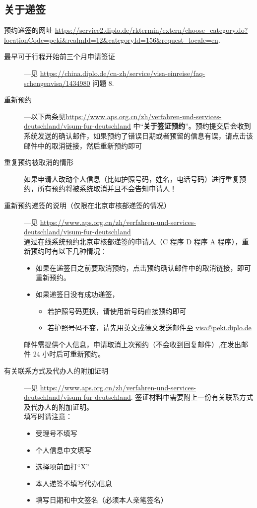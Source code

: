 \documentclass{article}
\begin{document}
\subsection{关于递签}\label{sec:visa}
预约递签的网址 \url{https://service2.diplo.de/rktermin/extern/choose_category.do?locationCode=peki&realmId=12&categoryId=156&request_locale=en}.
\begin{description}
\item[最早可于行程开始前三个月申请签证] ---见 \url{https://china.diplo.de/cn-zh/service/visa-einreise/faq-schengenvisa/1434980} 问题 8.
\item[重新预约] ---以下两条见\sloppy \url{https://www.aps.org.cn/zh/verfahren-und-services-deutschland/visum-fur-deutschland} 中“\textbf{关于签证预约}”。预约提交后会收到系统发送的确认邮件，如果预约了错误日期或者预留的信息有误，请点击该邮件中的取消链接，然后重新预约即可
\item[重复预约被取消的情形] 如果申请人改动个人信息（比如护照号码，姓名，电话号码）进行重复预约，所有预约将被系统取消并且不会告知申请人！ 
\item[重新预约递签的说明（仅限在北京审核部递签的情况）] ---见 \url{https://www.aps.org.cn/zh/verfahren-und-services-deutschland/visum-fur-deutschland}\\
通过在线系统预约北京审核部递签的申请人（C 程序 D 程序 A 程序），重新预约时有以下几种情况：
\begin{itemize}
\item 如果在递签日之前要取消预约，点击预约确认邮件中的取消链接，即可重新预约。
\item 如果递签日没有成功递签，
\begin{itemize}
  \item 若护照号码更换，请使用新号码直接预约即可
  \item 若护照号码不变，请先用英文或德文发送邮件至 \href{mailto:visa@peki.diplo.de}{visa@peki.diplo.de}
\end{itemize}
\end{itemize}
邮件需提供个人信息，申请取消上次预约（不会收到回复邮件）,在发出邮件 24 小时后可重新预约。
\item[有关联系方式及代办人的附加证明] ---见 \url{https://www.aps.org.cn/zh/verfahren-und-services-deutschland/visum-fur-deutschland}.
签证材料中需要附上一份有关联系方式及代办人的附加证明。\\
填写时请注意：
\begin{itemize}
  \item 受理号不填写
  \item 个人信息中文填写
  \item 选择项前面打“X”
  \item 本人递签不填写代办信息
  \item 填写日期和中文签名（必须本人亲笔签名）
\end{itemize}
\end{description}
\end{document}
